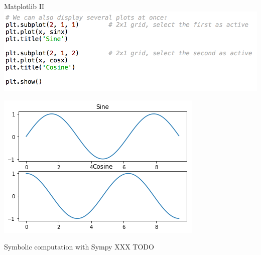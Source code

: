 \documentclass[11pt,unknownkeysallowed,usenames,dvipsnames]{beamer}
\begin{document}
\begin{frame}{Matplotlib II}
	\includegraphics[width=0.9\linewidth]{code-matplotlib2}
	
	\centering    \includegraphics[width=0.4\linewidth]{plot2}
\end{frame}


\begin{frame}{Symbolic computation with Sympy}
    XXX TODO
\end{frame}
\end{document}
